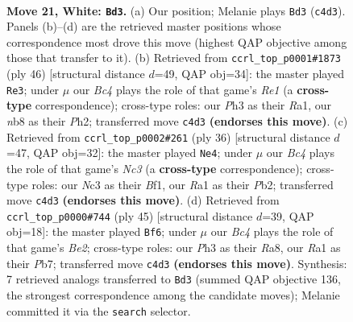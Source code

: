 \documentclass[11pt]{article}
\begin{document}
\clearpage

\begin{figure}[p]\centering
\begin{subfigure}{0.46\textwidth}\centering
\resizebox{\linewidth}{!}{%
\newchessgame
\chessboard[
  setfen={rnb1k1r1/5p2/1p2p3/p3P1p1/P1B5/2N4P/1P3PP1/R2R2K1 w q - 1 21},
  showmover=false,
  pgfstyle=straightmove, color=movearrow, markmove={c4-d3}
]}
\caption{}
\end{subfigure}\hfill
\begin{subfigure}{0.46\textwidth}\centering
\resizebox{\linewidth}{!}{%
\newchessgame
\chessboard[
  setfen={1rr3k1/p4p2/4p1pB/2n1P3/4p3/6N1/P1b2PPP/R3R1K1 w - - 2 24},
  showmover=false,
  pgfstyle=straightmove, color=movearrow, markmove={e1-e3}
]}
\caption{}
\end{subfigure}
\\[4pt]
\begin{subfigure}{0.46\textwidth}\centering
\resizebox{\linewidth}{!}{%
\newchessgame
\chessboard[
  setfen={r3k3/pb3p2/2p1p3/1p4r1/2pP2n1/2N4R/PP3PP1/R3KB2 w Qq - 0 19},
  showmover=false,
  pgfstyle=straightmove, color=movearrow, markmove={c3-e4}
]}
\caption{}
\end{subfigure}\hfill
\begin{subfigure}{0.46\textwidth}\centering
\resizebox{\linewidth}{!}{%
\newchessgame
\chessboard[
  setfen={r1r3k1/1p2bppp/p3n3/P2p4/1P6/3PBN2/R4PPP/1R3K2 b - - 2 23},
  showmover=false,
  pgfstyle=straightmove, color=movearrow, markmove={e7-f6}
]}
\caption{}
\end{subfigure}
\caption{\textbf{Move 21, White: \texttt{Bd3}.} (a) Our position; Melanie plays \texttt{Bd3} (\texttt{c4d3}). Panels (b)--(d) are the retrieved master positions whose correspondence most drove this move (highest QAP objective among those that transfer to it). (b) Retrieved from \texttt{ccrl\_top\_p0001\#1873} (ply 46) [structural distance $d$=49, QAP obj=34]: the master played \texttt{Re3}; under $\mu$ our \emph{Bc4} plays the role of that game's \emph{Re1} (a \textbf{cross-type} correspondence); cross-type roles: our \emph{P}h3 as their \emph{R}a1, our \emph{n}b8 as their \emph{P}h2; transferred move \texttt{c4d3} \textbf{(endorses this move)}. (c) Retrieved from \texttt{ccrl\_top\_p0002\#261} (ply 36) [structural distance $d$=47, QAP obj=32]: the master played \texttt{Ne4}; under $\mu$ our \emph{Bc4} plays the role of that game's \emph{Nc3} (a \textbf{cross-type} correspondence); cross-type roles: our \emph{N}c3 as their \emph{B}f1, our \emph{R}a1 as their \emph{P}b2; transferred move \texttt{c4d3} \textbf{(endorses this move)}. (d) Retrieved from \texttt{ccrl\_top\_p0000\#744} (ply 45) [structural distance $d$=39, QAP obj=18]: the master played \texttt{Bf6}; under $\mu$ our \emph{Bc4} plays the role of that game's \emph{Be2}; cross-type roles: our \emph{P}h3 as their \emph{R}a8, our \emph{R}a1 as their \emph{P}b7; transferred move \texttt{c4d3} \textbf{(endorses this move)}. Synthesis: 7 retrieved analogs transferred to \texttt{Bd3} (summed QAP objective 136, the strongest correspondence among the candidate moves); Melanie committed it via the \texttt{search} selector.}
\label{fig:thought-m40}
\end{figure}
\end{document}
